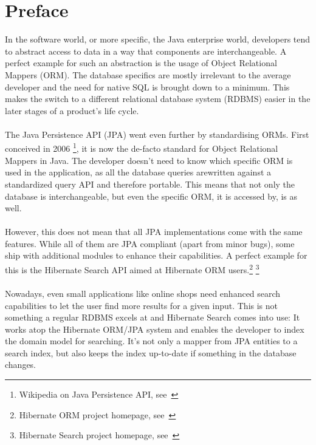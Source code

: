 \section{Preface}\label{Preface}
In the software world, or more specific, the Java enterprise world, developers tend to abstract access to data in a way that components are interchangeable. A perfect example for such an abstraction is the usage of Object Relational Mappers (ORM). The database specifics are mostly irrelevant to the average developer and the need for native SQL is brought down to a minimum. This makes the switch to a different relational database system (RDBMS) easier in the later stages of a product's life cycle.
\\\\
The Java Persistence API (JPA) went even further by standardising ORMs. First conceived in 2006 \footnote{Wikipedia on Java Persistence API, see~\cite{wiki_jpa}}, it is now the de-facto standard for Object Relational Mappers in Java. The developer doesn't need to know which specific ORM is used in the application, as all the database queries arewritten against a standardized query API and therefore portable. This means that not only the database is interchangeable, but even the specific ORM, it is accessed by, is as well.
\\\\
However, this does not mean that all JPA implementations come with the same features. While all of them are JPA compliant (apart from minor bugs), some ship with additional modules to enhance their capabilities. A perfect example for this is the Hibernate Search API aimed at Hibernate ORM users.\footnote{Hibernate ORM project homepage, see~\cite{hibernate_orm}} \footnote{Hibernate Search project homepage, see~\cite{hibernate_search_homepage}}
\\\\
Nowadays, even small applications like online shops need enhanced search capabilities to let the user find more results for a given input.
This is not something a regular RDBMS excels at and Hibernate Search comes into use: It works atop the Hibernate ORM/JPA system and enables the developer to index the domain model for searching. It's not only a mapper from JPA entities to a search index, but also keeps the index up-to-date if something in the database changes.
\\
